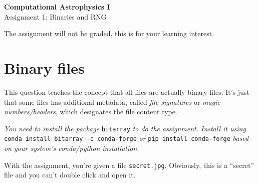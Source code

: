 \documentclass[12pt]{article}
\begin{document}
\begin{center}
    \Large \textbf{Computational Astrophysics I}\\[6pt]
    \large Assignment 1: Binaries and RNG\\[6pt]
\end{center}


\bigskip


The assignment will not be graded, this is for your learning interest.


\section{Binary files}

This question teaches the concept that all files are actually binary files. It's just that some files has additional metadata, called \textit{file signatures} or \textit{magic numbers/headers}, which designates the file content type.

\vspace{10pt}

\textit{You need to install the package} \texttt{bitarray} \textit{to do the assignment. Install it using} \texttt{conda install bitarray -c conda-forge} \textit{or} \texttt{pip install conda-forge} \textit{based on your system's conda/python installation.}

\vspace{10pt}

With the assignment, you're given a file \texttt{secret.jpg}. Obviously, this is a ``secret'' file and you can't double click and open it.
\end{document}
